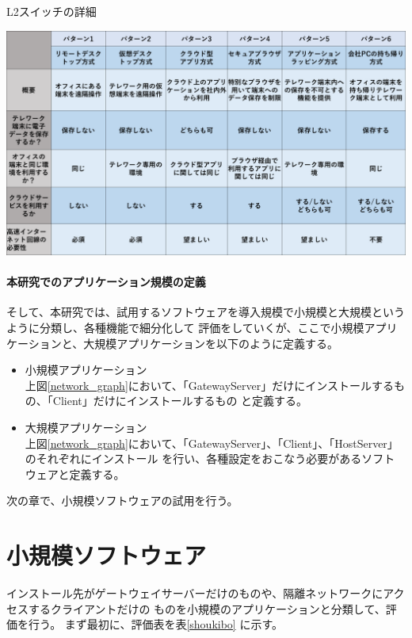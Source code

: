 \documentclass[11pt,a4j,titlepage]{jreport}
\begin{document}
\begin{table}[H]
    \centering
    \caption{L2スイッチの詳細}
    \includegraphics*[width=1.0\textwidth,page=7]{graphs/telework_list.pdf}
    \label{switch_detail}
\end{table}


\subsubsection{本研究でのアプリケーション規模の定義}
そして、本研究では、試用するソフトウェアを導入規模で小規模と大規模というように分類し、各種機能で細分化して
評価をしていくが、ここで小規模アプリケーションと、大規模アプリケーションを以下のように定義する。


\begin{itemize}
    \item 小規模アプリケーション\mbox{}\\
    上図\ref{network_graph}において、「GatewayServer」だけにインストールするもの、「Client」だけにインストールするもの
    と定義する。
    \item 大規模アプリケーション\mbox{}\\
    上図\ref{network_graph}において、「GatewayServer」、「Client」、「HostServer」のそれぞれにインストール
    を行い、各種設定をおこなう必要があるソフトウェアと定義する。


\end{itemize}

次の章で、小規模ソフトウェアの試用を行う。

\chapter{小規模ソフトウェア}
インストール先がゲートウェイサーバーだけのものや、隔離ネットワークにアクセスするクライアントだけの
ものを小規模のアプリケーションと分類して、評価を行う。
まず最初に、評価表を表\ref{shoukibo} に示す。
\end{document}

